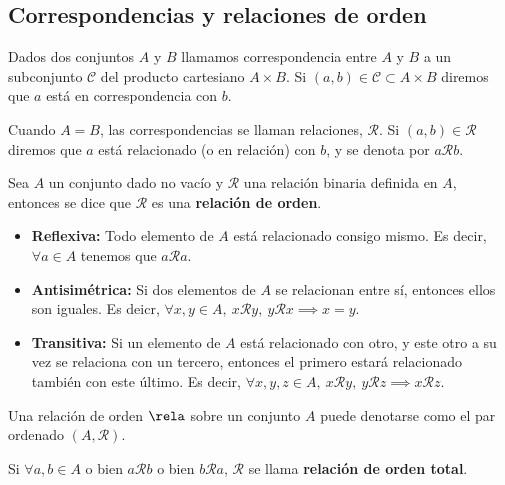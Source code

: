 \newpage
\subsection{Correspondencias y relaciones de orden}
\begin{definicion}
    Dados dos conjuntos $A$ y $B$ llamamos correspondencia entre $A$ y $B$ a un subconjunto $\mathcal{C}$ del producto cartesiano $A\times B$. Si $\left( a, b \right) \in\mathcal{C}\subset A\times B$ diremos que $a$ está en correspondencia con $b$.
\end{definicion}
\begin{definicion}
    Cuando $A = B$, las correspondencias se llaman relaciones, $\mathcal{R}$. Si $\left( a, b \right)\in\mathcal{R} $ diremos que $a$ está relacionado (o en relación) con $b$, y se denota por $a\mathcal{R}b$.
\end{definicion}
\begin{definition}
    Sea $A$ un conjunto dado no vacío y $\mathcal{R}$ una relación binaria definida en $A$, entonces se dice que $\mathcal{R}$ es una \textbf{relación de orden}.
    \begin{itemize}
        \item\textbf{Reflexiva:} Todo elemento de $A$ está relacionado consigo mismo. Es decir, $\forall a\in A$ tenemos que $a\mathcal{R} a$.
        \item\textbf{Antisimétrica:} Si dos elementos de $A$ se relacionan entre sí, entonces ellos son iguales. Es deicr, $\forall x, y\in A,\ x\mathcal{R} y,\ y\mathcal{R} x \implies x = y$.
        \item\textbf{Transitiva:} Si un elemento de $A$ está relacionado con otro, y este otro a su vez se relaciona con un tercero, entonces el primero estará relacionado también con este último. Es decir, $\forall x, y, z\in A,\ x\mathcal{R} y,\ y\mathcal{R}z\implies x\mathcal{R}z$.
    \end{itemize}
\end{definition}
\begin{notacion}
    Una relación de orden $\rela$ sobre un conjunto $A$ puede denotarse como el par ordenado $\left( A, \mathcal{R} \right) $.
\end{notacion}
\begin{definition}
    Si $\forall a, b\in A$ o bien $a\mathcal{R} b$ o bien $b\mathcal{R} a$, $\mathcal{R}$ se llama \textbf{relación de orden total}.
\end{definition}
